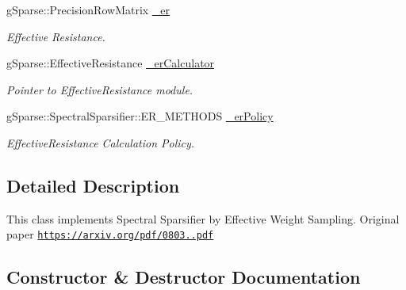 \begin{DoxyCompactItemize}
\mbox{\label{classg_sparse_1_1_spectral_sparsifier_1_1_e_r_sampling_a54a2bc9c9dfda467a946c64afcfc46fc}} 
g\+Sparse\+::\+Precision\+Row\+Matrix \mbox{\hyperlink{classg_sparse_1_1_spectral_sparsifier_1_1_e_r_sampling_a54a2bc9c9dfda467a946c64afcfc46fc}{\+\_\+er}}
\begin{DoxyCompactList}\small\item\em Effective Resistance. \end{DoxyCompactList}\item 
\mbox{\label{classg_sparse_1_1_spectral_sparsifier_1_1_e_r_sampling_aa6ab4a22339f9846fabc82437dced6f2}} 
g\+Sparse\+::\+Effective\+Resistance \mbox{\hyperlink{classg_sparse_1_1_spectral_sparsifier_1_1_e_r_sampling_aa6ab4a22339f9846fabc82437dced6f2}{\+\_\+er\+Calculator}}
\begin{DoxyCompactList}\small\item\em Pointer to Effective\+Resistance module. \end{DoxyCompactList}\item 
\mbox{\label{classg_sparse_1_1_spectral_sparsifier_1_1_e_r_sampling_a26b6aebe0adb1851149c74017fdb73e0}} 
g\+Sparse\+::\+Spectral\+Sparsifier\+::\+E\+R\+\_\+\+M\+E\+T\+H\+O\+DS \mbox{\hyperlink{classg_sparse_1_1_spectral_sparsifier_1_1_e_r_sampling_a26b6aebe0adb1851149c74017fdb73e0}{\+\_\+er\+Policy}}
\begin{DoxyCompactList}\small\item\em Effective\+Resistance Calculation Policy. \end{DoxyCompactList}\end{DoxyCompactItemize}


\subsection{Detailed Description}
This class implements Spectral Sparsifier by Effective Weight Sampling. Original paper \href{https://arxiv.org/pdf/0803.0929.pdf}{\tt https\+://arxiv.\+org/pdf/0803..\+pdf} 

\subsection{Constructor \& Destructor Documentation}
\mbox{\label{classg_sparse_1_1_spectral_sparsifier_1_1_e_r_sampling_a1ceb48c424600cbe6d315f3f5bad1598}} 

